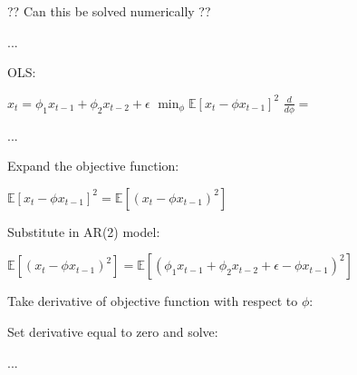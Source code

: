 \documentclass[10pt]{article}
\begin{document}
?? Can this be solved numerically ??

...

OLS:

$x_t = \phi_1 x_{t-1} + \phi_2 x_{t-2} + \epsilon$  
$\min_{\phi} \mathbb{E} \left[ x_t - \phi x_{t-1} \right]^2$  
$\frac{d}{d\phi} = $

...

Expand the objective function:

$\mathbb{E} \left[ x_t - \phi x_{t-1} \right]^2 = \mathbb{E} \left[ (x_t - \phi x_{t-1})^2 \right]$

Substitute in AR(2) model:

$\mathbb{E} \left[ (x_t - \phi x_{t-1})^2 \right] = \mathbb{E} \left[ (\phi_1 x_{t-1} + \phi_2 x_{t-2} + \epsilon - \phi x_{t-1})^2 \right]$

Take derivative of objective function with respect to $\phi$:

Set derivative equal to zero and solve:

...

\printbibliography
\end{document}
